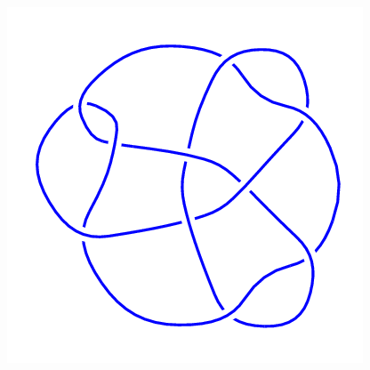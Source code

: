 \begin{figure}[H]
\begin{minipage}[b]{.18\linewidth}
    \end{minipage}
    \begin{minipage}[b]{.18\linewidth}
        \centering
        \includegraphics[width=\linewidth]{../data/10_101.png}
    \end{minipage}
\end{figure}
